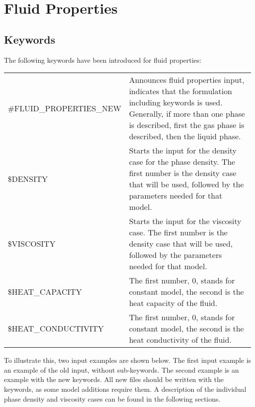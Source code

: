 \section{Fluid Properties}
\subsection{Keywords}
The following keywords have been introduced for fluid
properties:

\begin{tabular}{lp{6.5cm}}
\#FLUID\_PROPERTIES\_NEW & Announces fluid properties input,
indicates that the formulation including keywords is used.
Generally, if more than one phase is described, first the gas
phase is described, then the liquid phase.\\
\$DENSITY & Starts the input for the density case for the phase
density. The first number is the density case that will be used,
followed by the
parameters needed for that model.\\
\$VISCOSITY & Starts the input for the viscosity case. The first
number is the density case that will be used, followed by the
parameters needed for that model.\\
\$HEAT\_CAPACITY & The first number, 0, stands for constant model,
the second is the heat capacity of the fluid.\\
\$HEAT\_CONDUCTIVITY & The first number, 0, stands for constant
model,
the second is the heat conductivity of the fluid.\\
\end{tabular}

To illustrate this, two input examples are shown below.  The first
input example is an example of the old input, without
sub-keywords. The second example is an example with the new
keywords.  All new files should be written with the keywords, as
some model additions require them.  A description of the individual phase density and
viscosity cases can be found in the following sections.
\\

